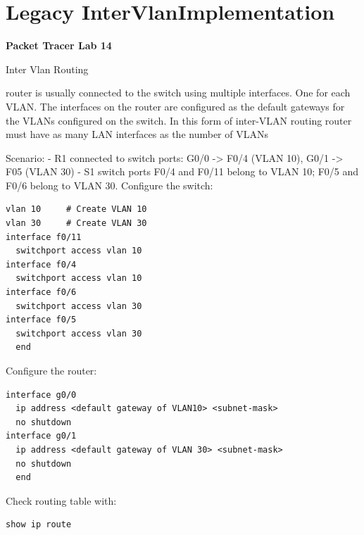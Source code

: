 \documentclass[../EngineeringJournal_CDavis.tex]{subfiles}
\begin{document}

\chapter[Legacy InterVlan Implementation]{Legacy InterVlan\linebreak[1]
Implementation \hspace*{\fill March 5, 2020}}
\noindent\textbf{{Packet Tracer Lab 14} }                             


\hspace{0.2cm}
\begin{tcolorbox}[width=6.3in]
\scriptsize 
Inter Vlan Routing
  \begin{outline}
    \1 router is usually connected to the switch using multiple interfaces.
      \2 One for each VLAN. 
    \1 The interfaces on the router are configured as the default gateways 
      \2 for the VLANs configured on the switch. 
    \1 In this form of inter-VLAN routing 
      \2 router must have as many LAN interfaces as the number of VLANs
  \end{outline}
\normalsize
Scenario:
\scriptsize
- R1 connected to switch ports: G0/0 -> F0/4 (VLAN 10), G0/1 -> F05 (VLAN 30)
- S1 switch ports F0/4 and F0/11 belong to VLAN 10; F0/5 and F0/6 belong to VLAN 30.
\normalsize
Configure the switch:
\scriptsize
\begin{verbatim}
vlan 10		# Create VLAN 10
vlan 30		# Create VLAN 30
interface f0/11
  switchport access vlan 10
interface f0/4
  switchport access vlan 10
interface f0/6
  switchport access vlan 30
interface f0/5
  switchport access vlan 30
  end
\end{verbatim}
\normalsize
Configure the router:
\scriptsize
\begin{verbatim}
interface g0/0
  ip address <default gateway of VLAN10> <subnet-mask>
  no shutdown
interface g0/1
  ip address <default gateway of VLAN 30> <subnet-mask>
  no shutdown
  end
\end{verbatim}
\normalsize
Check routing table with:
\scriptsize
\begin{verbatim}
show ip route
\end{verbatim}
\end{tcolorbox}
\hspace{0.2cm}
\normalsize  
  
\end{document}
